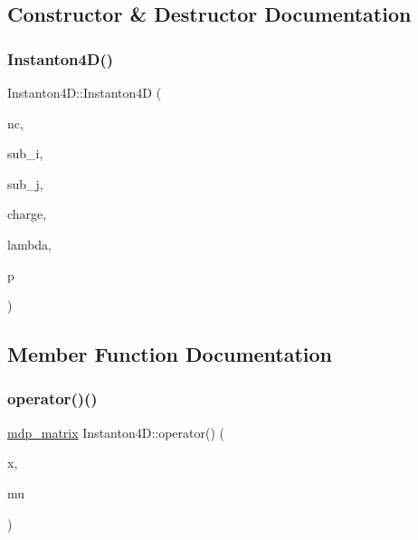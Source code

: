 \subsection{Constructor \& Destructor Documentation}
\mbox{\label{class_instanton4_d_ab23484422ea50f59e0856d51cce1cb8b}} 
\subsubsection{\texorpdfstring{Instanton4\+D()}{Instanton4D()}}
{\footnotesize\ttfamily Instanton4\+D\+::\+Instanton4D (\begin{DoxyParamCaption}\item[{int}]{nc,  }\item[{int}]{sub\+\_\+i,  }\item[{int}]{sub\+\_\+j,  }\item[{\hyperlink{mdp__global__vars_8h_a69d96b74c791e0bbdb888b3913a69450}{mdp\+\_\+real}}]{charge,  }\item[{\hyperlink{mdp__global__vars_8h_a69d96b74c791e0bbdb888b3913a69450}{mdp\+\_\+real}}]{lambda,  }\item[{vector$<$ \hyperlink{mdp__global__vars_8h_a69d96b74c791e0bbdb888b3913a69450}{mdp\+\_\+real} $>$ \&}]{p }\end{DoxyParamCaption})\hspace{0.3cm}{\ttfamily [inline]}}



\subsection{Member Function Documentation}
\mbox{\label{class_instanton4_d_aa03767e0f05830b33e34b3be0f9fc447}} 
\subsubsection{\texorpdfstring{operator()()}{operator()()}}
{\footnotesize\ttfamily \hyperlink{classmdp__matrix}{mdp\+\_\+matrix} Instanton4\+D\+::operator() (\begin{DoxyParamCaption}\item[{\hyperlink{classmdp__site}{mdp\+\_\+site} \&}]{x,  }\item[{int}]{mu }\end{DoxyParamCaption})\hspace{0.3cm}{\ttfamily [inline]}}



